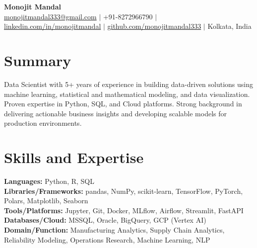 \documentclass[a4paper,10pt]{article}
\begin{document}
\begin{center}
    {\LARGE \textbf{Monojit Mandal}}\\
    \href{mailto:monojitmandal333@gmail.com}{monojitmandal333@gmail.com} $|$ +91-8272966790 $|$ 
    \href{https://www.linkedin.com/in/monojitmandal/}{linkedin.com/in/monojitmandal} $|$ 
    \href{https://github.com/monojitmandal333}{github.com/monojitmandal333} $|$ Kolkata, India
\end{center}

\section*{Summary}
Data Scientist with 5+ years of experience in building data-driven solutions using machine learning, statistical and mathematical modeling, and data visualization. Proven expertise in Python, SQL, and Cloud platforms. Strong background in delivering actionable business insights and developing scalable models for production environments.

\section*{Skills and Expertise}
\textbf{Languages:} Python, R, SQL \\
\textbf{Libraries/Frameworks:} pandas, NumPy, scikit-learn, TensorFlow, PyTorch, Polars, Matplotlib, Seaborn \\
\textbf{Tools/Platforms:} Jupyter, Git, Docker, MLflow, Airflow, Streamlit, FastAPI \\
\textbf{Databases/Cloud:} MSSQL, Oracle, BigQuery, GCP (Vertex AI)\\
\textbf{Domain/Function:} Manufacturing Analytics, Supply Chain Analytics, Reliability Modeling, Operations Research, Machine Learning, NLP

\end{document}
